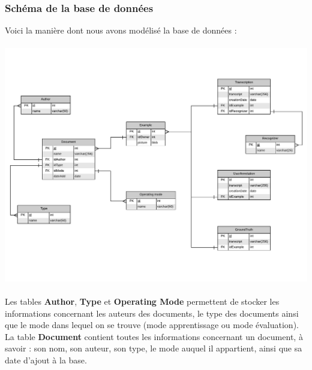\subsubsection{Schéma de la base de données}

Voici la manière dont nous avons modélisé la base de données :

\paragraph{}

\begin{mdframed}[frametitle={Figure 12 : Modèle entité association de la Base de données}, innerbottommargin=10]
\begin{center}
\includegraphics[scale=0.6]{Modele_entite_association.pdf}
\end{center}
\end{mdframed}

\paragraph{}

Les tables \textbf{Author}, \textbf{Type} et \textbf{Operating Mode} permettent
de stocker les informations concernant les auteurs des documents, le type des
documents ainsi que le mode dans lequel on se trouve (mode apprentissage ou
mode évaluation). La table \textbf{Document} contient toutes les informations
concernant un document, à savoir : son nom, son auteur, son type, le mode auquel
il appartient, ainsi que sa date d’ajout à la base.

